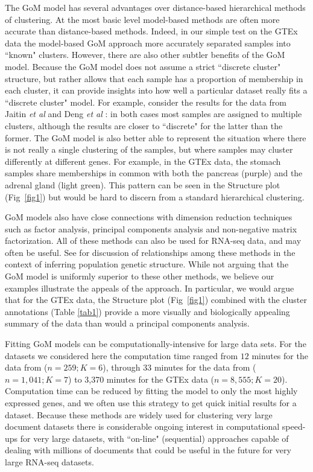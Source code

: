 \documentclass[10pt,letterpaper]{article}
\begin{document}
The GoM model has several advantages over distance-based hierarchical methods of clustering. At the most basic level model-based methods are often
more accurate than distance-based methods. Indeed, in our simple test on the GTEx data the model-based GoM approach
more accurately separated samples into ``known" clusters. However, there are also other subtler benefits of the GoM model. Because the GoM
model does not assume a strict ``discrete cluster" structure, but
rather allows that each sample has a proportion of membership in each cluster, it can provide insights into how well a
particular dataset really fits a ``discrete cluster" model. For example, consider the results for the data from Jaitin \textit{et al} \cite{Jaitin2014} and Deng \textit{et al} \cite{Deng2014}:
in both cases most samples are assigned to multiple clusters, although the results are closer to ``discrete" for the latter than the former.
The GoM model is also better able to represent the situation where there is not really a single clustering of the samples,
but where samples may cluster differently at different genes. For example, in the GTEx data, the stomach samples share memberships in common with
both the pancreas (purple) and the adrenal gland (light green). This pattern can be seen in the Structure plot (Fig~\ref{fig1}) but would be hard to
discern from a standard hierarchical clustering.

GoM models also have close connections with dimension reduction techniques such as factor analysis, principal components analysis and non-negative matrix factorization. All of these methods can also be used for RNA-seq data, and may often be useful. See  \cite{Engelhardt2010} for discussion of
relationships among these methods in the context of inferring population genetic structure. While not arguing that the GoM model
is uniformly superior to these other methods, we believe our examples illustrate the appeals of the approach. In particular, we would argue that for the GTEx data, the Structure plot (Fig~\ref{fig1}) combined with the cluster annotations (Table \ref{tab1}) provide a more visually and biologically appealing summary of the data
than would a principal components analysis.

Fitting GoM models can be computationally-intensive for large data sets. For the datasets we considered here the computation time ranged from $12$ minutes for the data from \cite{Deng2014} ($n=259; K=6$), through $33$ minutes for the
data from \cite{Jaitin2014} ($n=1,041; K=7$) to 3,370 minutes for the GTEx data ($n=8,555; K=20$).
Computation time can be reduced by fitting the model to only the most highly expressed genes, and we often use this strategy to get quick initial results for a dataset.
Because these methods are widely used for clustering very large document datasets there is considerable ongoing interest in
computational speed-ups for very large datasets, with ``on-line" (sequential) approaches capable of dealing with millions of documents  \cite{Hoffman2010} that could be useful in the future for very large RNA-seq datasets.
\end{document}
